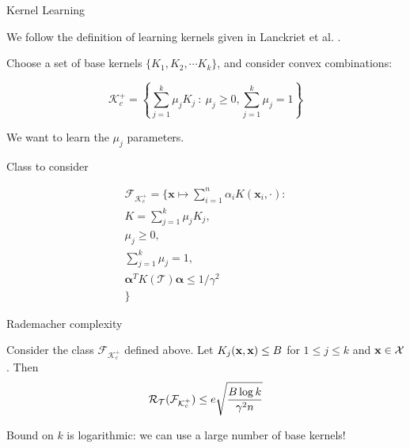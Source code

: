 \begin{frame}{Kernel Learning}

  We follow the definition of learning kernels given in Lanckriet et al. \cite{lanckriet2004learning}.

  \vspace*{1.2cm}
  
  Choose a set of base kernels $\{K_1, K_2, \cdots K_k\}$, and consider convex combinations:

  \[ \mathcal{K}^+_c = \left\{ \sum^k_{j=1} \mu_j K_j ~:~ \mu_j \geq 0, \sum^k_{j=1} \mu_j = 1 \right\}  \]

  We want to learn the $\mu_j$ parameters. 

\end{frame}


\begin{frame}{Class to consider}

  \begin{multline}
    \mathcal{F}_{\mathcal{K}^+_c} = \{ \mathbf{x} \mapsto \sum_{i=1}^n \alpha_i K(\mathbf{x}_i, \cdot) : \\
    K = \sum_{j=1}^k \mu_j K_j, \\
    \mu_j \geq 0,\\
    \sum_{j=1}^k \mu_j = 1, \\
    \boldsymbol\alpha^T K(\mathcal{T}) \boldsymbol\alpha \leq 1 / \gamma^2 \\
    \} 
  \end{multline}
  
\end{frame}

\begin{frame}{Rademacher complexity}


  \begin{theorem}
    Consider the class $\mathcal{F}_{\mathcal{K}^+_c}$ defined above. Let $K_j(\operatorname{\mathbf{x}},\operatorname{\mathbf{x}}) \leq B$ for $1 \leq j \leq k$ and $\operatorname{\mathbf{x}} \in \operatorname{\mathcal{X}}$. Then
    \[ \operatorname{\mathcal{R}}_{\mathcal{T}}(\mathcal{F}_{\mathcal{K}^+_c}) \leq e \sqrt{\frac{B \log k}{\gamma^2 n}} \]
  \end{theorem}
  
  Bound on $k$ is logarithmic: we can use a large number of base kernels!
  
\end{frame}


